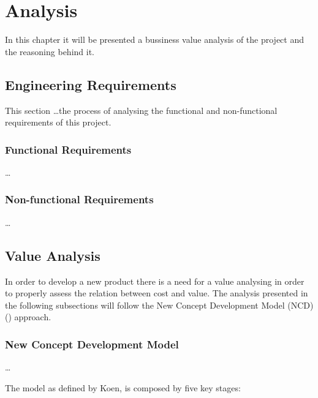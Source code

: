 
\chapter{Analysis} %
\label{chap:Chapter3} %

In this chapter it will be presented a bussiness value analysis of the project and the reasoning behind it. 

\section{Engineering Requirements}

This section \dots the process of analysing the functional and non-functional requirements of this project.

\subsection{Functional Requirements}

\dots

\subsection{Non-functional Requirements}

\dots

\section{Value Analysis}

In order to develop a new product there is a need for a value analysing in order to properly assess the relation between cost and value.
The analysis presented in the following subsections will follow the New Concept Development Model (NCD) (\cite{koen_2001}) approach.

\subsection{New Concept Development Model}

\dots

The model as defined by Koen, is composed by five key stages:

